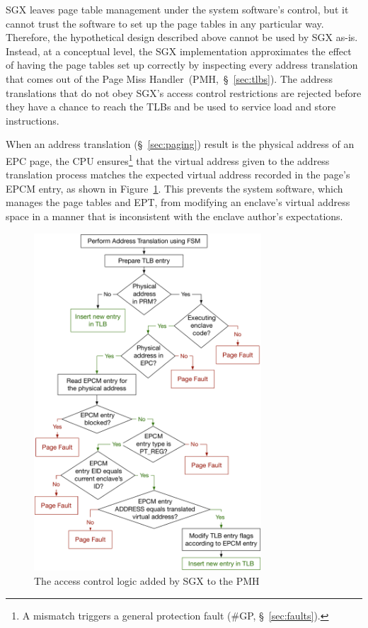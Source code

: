 
SGX leaves page table management under the system software's control, but it
cannot trust the software to set up the page tables in any particular way.
Therefore, the hypothetical design described above cannot be used by SGX as-is.
Instead, at a conceptual level, the SGX implementation approximates the effect
of having the page tables set up correctly by inspecting every address
translation that comes out of the Page Miss Handler~(PMH,~\S~\ref{sec:tlbs}).
The address translations that do not obey SGX's access control restrictions
are rejected before they have a chance to reach the TLBs and be used to service
load and store instructions.

When an address translation (\S~\ref{sec:paging}) result is the physical
address of an EPC page, the CPU ensures\footnote{A mismatch triggers a general
protection fault (\#GP, \S~\ref{sec:faults}).} that the virtual address given
to the address translation process matches the expected virtual address
recorded in the page's EPCM entry, as shown in
Figure~\ref{fig:sgx_tlb_miss_checks}. This prevents the system software, which
manages the page tables and EPT, from modifying an enclave's virtual address
space in a manner that is inconsistent with the enclave author's expectations.

\begin{figure}[hbt]
  \centering
  \includegraphics[width=85mm]{figures/sgx_tlb_miss_checks.pdf}
  \caption{
    The access control logic added by SGX to the PMH
  }
  \label{fig:sgx_tlb_miss_checks}
\end{figure}

